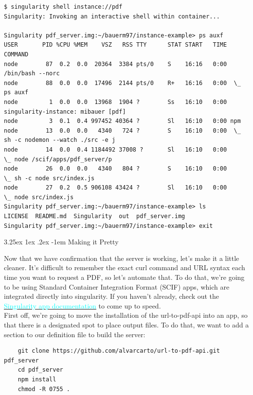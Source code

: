 \documentclass[a4paper]{article}
\makeatletter
\renewcommand\paragraph{\@startsection{paragraph}{5}{\z@}%
  {3.25ex \@plus1ex \@minus.2ex}%
  {-1em}%
  {\normalfont\normalsize\bfseries}}
\makeatother
\begin{document}
\begin{lstlisting}[frame=single]
$ singularity shell instance://pdf 
Singularity: Invoking an interactive shell within container...

Singularity pdf_server.img:~/bauerm97/instance-example> ps auxf
USER       PID %CPU %MEM    VSZ   RSS TTY      STAT START   TIME COMMAND
node        87  0.2  0.0  20364  3384 pts/0    S    16:16   0:00 /bin/bash --norc
node        88  0.0  0.0  17496  2144 pts/0    R+   16:16   0:00  \_ ps auxf
node         1  0.0  0.0  13968  1904 ?        Ss   16:10   0:00 singularity-instance: mibauer [pdf]
node         3  0.1  0.4 997452 40364 ?        Sl   16:10   0:00 npm                          
node        13  0.0  0.0   4340   724 ?        S    16:10   0:00  \_ sh -c nodemon --watch ./src -e j
node        14  0.0  0.4 1184492 37008 ?       Sl   16:10   0:00      \_ node /scif/apps/pdf_server/p
node        26  0.0  0.0   4340   804 ?        S    16:10   0:00          \_ sh -c node src/index.js
node        27  0.2  0.5 906108 43424 ?        Sl   16:10   0:00              \_ node src/index.js
Singularity pdf_server.img:~/bauerm97/instance-example> ls
LICENSE  README.md  Singularity  out  pdf_server.img
Singularity pdf_server.img:~/bauerm97/instance-example> exit  
\end{lstlisting}

	\paragraph{Making it Pretty}
	
Now that we have confirmation that the server is working, let’s make it a little cleaner. It’s difficult to remember the exact curl command and URL syntax each time you want to request a PDF, so let’s automate that. To do that, we’re going to be using Standard Container Integration Format (SCIF) apps, which are integrated directly into singularity. If you haven’t already, check out the \hyperref[sec:scifapps]{{\textcolor{cyan}{Singularity app documentation}}} to come up to speed.\\[0.1in]
First off, we’re going to move the installation of the url-to-pdf-api into an app, so that there is a designated spot to place output files. To do that, we want to add a section to our definition file to build the server:

\begin{lstlisting}[frame=single] 
%appinstall pdf_server
    git clone https://github.com/alvarcarto/url-to-pdf-api.git pdf_server
    cd pdf_server
    npm install
    chmod -R 0755 . 
\end{lstlisting}
\end{document}
